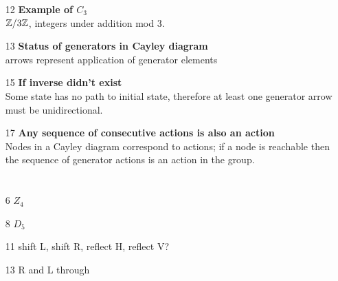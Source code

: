 \documentclass[12pt]{article}
\begin{document}
\begin{enumerate}
\begin{mdframed}
  \end{mdframed}
  \checkmark
\item[12] {\bf Example of $C_3$}\\
  $\mathbb{Z}/3\mathbb{Z}$, integers under addition mod 3.
\item[13] {\bf Status of generators in Cayley diagram}\\
  arrows represent application of generator elements
\item[15] {\bf If inverse didn't exist}\\
  Some state has no path to initial state, therefore at least one generator arrow must be
  unidirectional.  
\item[17] {\bf Any sequence of consecutive actions is also an action}\\
  Nodes in a Cayley diagram correspond to actions; if a node is reachable then the sequence of
  generator actions is an action in the group.
\end{enumerate}


\section{}
\begin{enumerate}
\item[6] $Z_4$ \checkmark
\item[8] $D_5$ \checkmark
\item[11] shift L, shift R, reflect H, reflect V?
\item[13] R and L through \checkmark
\end{enumerate}
\end{document}
